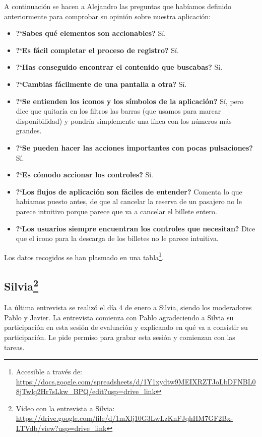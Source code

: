 A continuación se hacen a Alejandro las preguntas que habíamos definido anteriormente para comprobar su opinión sobre nuestra aplicación:

\begin{itemize}
    \item \textbf{?`Sabes qué elementos son accionables?} Sí. 
    \item \textbf{?`Es fácil completar el proceso de registro?} Sí. 
    \item \textbf{?`Has conseguido encontrar el contenido que buscabas?} Sí.
    \item \textbf{?`Cambias fácilmente de una pantalla a otra?} Sí.
    \item \textbf{?`Se entienden los iconos y los símbolos de la aplicación?} Sí, pero dice que quitaría en los filtros las
        barras (que usamos para marcar disponibilidad) y pondría simplemente una línea con los números más grandes. 
    \item \textbf{?`Se pueden hacer las acciones importantes con pocas pulsaciones?} Sí.
    \item \textbf{?`Es cómodo accionar los controles?} Sí.
    \item \textbf{?`Los flujos de aplicación son fáciles de entender?} Comenta lo que habíamos puesto antes, de que al cancelar la reserva
        de un pasajero no le parece intuitivo porque parece que va a cancelar el billete entero.
    \item \textbf{?`Los usuarios siempre encuentran los controles que necesitan?} Dice que el icono para la descarga
        de los billetes no le parece intuitiva.
\end{itemize}

Los datos recogidos se han plasmado en una tabla\footnote{Accesible a través de:
 \url{https://docs.google.com/spreadsheets/d/1Y1xydtw9MEIXRZTJoLbDFNBL08jTwlq2Hr7sLkw_BPQ/edit?usp=drive_link}}.

\subsection[Silvia]{Silvia\footnote{Vídeo con la entrevista a Silvia: \url{https://drive.google.com/file/d/1mXlj10G3LwLzKnFJqhHM7GF2Bx-LTVdb/view?usp=drive_link}}}

La última entrevista se realizó el día 4 de enero a Silvia, siendo los moderadores Pablo y Javier. La entrevista comienza con Pablo agradeciendo a Silvia su participación en esta sesión de evaluación y explicando en qué va a consistir su participación. Le pide permiso para grabar esta sesión y comienzan con las tareas.

